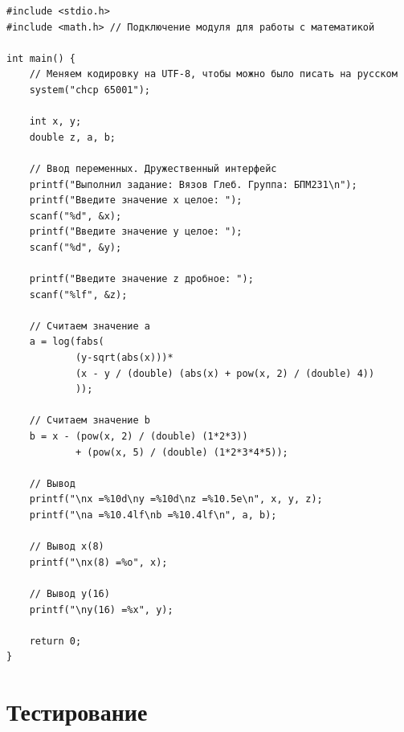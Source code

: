 \documentclass[12pt]{article}
\begin{document}
\begin{lstlisting}[label=string_code1,caption=C]
#include <stdio.h>
#include <math.h> // Подключение модуля для работы с математикой

int main() {
    // Меняем кодировку на UTF-8, чтобы можно было писать на русском
    system("chcp 65001");

    int x, y;
    double z, a, b;

    // Ввод переменных. Дружественный интерфейс
    printf("Выполнил задание: Вязов Глеб. Группа: БПМ231\n");
    printf("Введите значение x целое: ");
    scanf("%d", &x);
    printf("Введите значение y целое: ");
    scanf("%d", &y);

    printf("Введите значение z дробное: ");
    scanf("%lf", &z);

    // Считаем значение a
    a = log(fabs(
            (y-sqrt(abs(x)))*
            (x - y / (double) (abs(x) + pow(x, 2) / (double) 4))
            ));

    // Считаем значение b
    b = x - (pow(x, 2) / (double) (1*2*3))
            + (pow(x, 5) / (double) (1*2*3*4*5));

    // Вывод
    printf("\nx =%10d\ny =%10d\nz =%10.5e\n", x, y, z);
    printf("\na =%10.4lf\nb =%10.4lf\n", a, b);

    // Вывод x(8)
    printf("\nx(8) =%o", x);

    // Вывод y(16)
    printf("\ny(16) =%x", y);

    return 0;
}

\end{lstlisting} 

\newpage


\section*{Тестирование}
\end{document}
